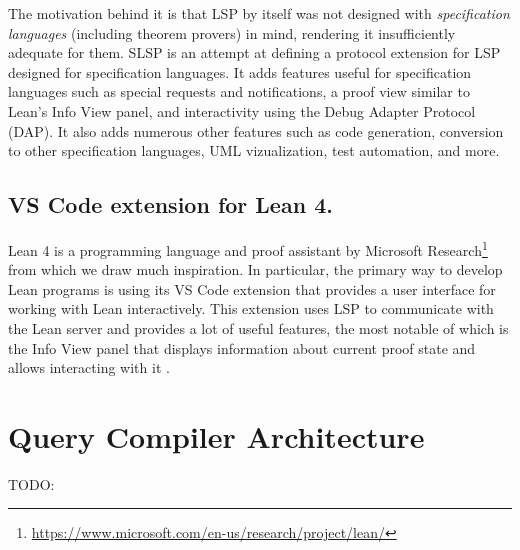 The motivation behind it is that LSP by itself was not designed with \textit{specification languages}
(including theorem provers) in mind, rendering it insufficiently adequate for them.
SLSP is an attempt at defining a protocol extension for LSP designed for specification languages.
It adds features useful for specification languages such as special requests and notifications,
a proof view similar to Lean's Info View panel, and interactivity using the Debug Adapter Protocol (DAP).
It also adds numerous other features such as code generation, conversion to other specification languages,
UML vizualization, test automation, and more.

\subsection{VS Code extension for Lean 4.}

Lean 4 \cite{deMouraUllrich2021} is a programming language and proof assistant
by Microsoft Research\footnote{\url{https://www.microsoft.com/en-us/research/project/lean/}}
from which we draw much inspiration.
In particular, the primary way to develop Lean programs is using its VS Code
extension that provides a user interface for working with Lean interactively.
This extension uses LSP to communicate with the Lean server and provides a lot
of useful features, the most notable of which is the Info View panel that
displays information about current proof state and allows interacting with it \cite{Nawrocki2023}.

\section{Query Compiler Architecture}

TODO: \cite{Shaikhha2016} \cite{Tahboub2018}

